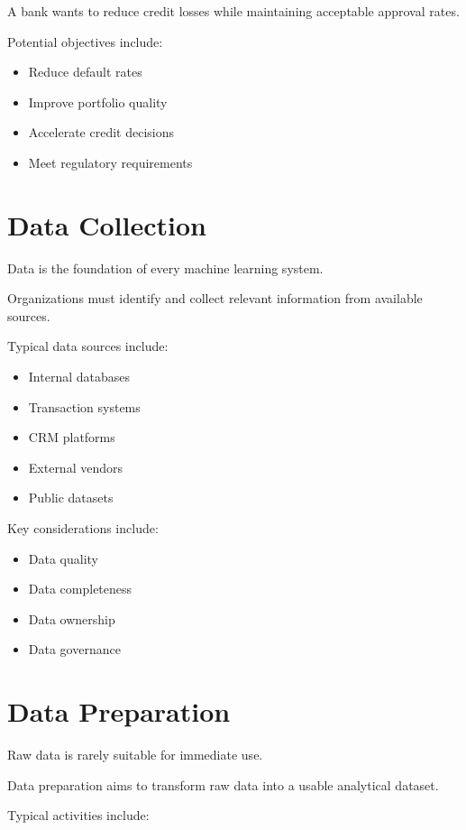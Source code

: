 A bank wants to reduce credit losses while maintaining acceptable approval rates.

Potential objectives include:

\begin{itemize}
    \item Reduce default rates
    \item Improve portfolio quality
    \item Accelerate credit decisions
    \item Meet regulatory requirements
\end{itemize}

\section{Data Collection}

Data is the foundation of every machine learning system.

Organizations must identify and collect relevant information from available sources.

Typical data sources include:

\begin{itemize}
    \item Internal databases
    \item Transaction systems
    \item CRM platforms
    \item External vendors
    \item Public datasets
\end{itemize}

Key considerations include:

\begin{itemize}
    \item Data quality
    \item Data completeness
    \item Data ownership
    \item Data governance
\end{itemize}

\section{Data Preparation}

Raw data is rarely suitable for immediate use.

Data preparation aims to transform raw data into a usable analytical dataset.

Typical activities include:

